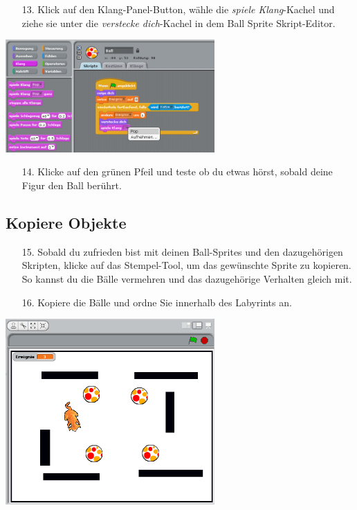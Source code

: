 \begin{itemize}
\item[13.] Klick auf den Klang-Panel-Button, wähle die \textit{spiele Klang}-Kachel und ziehe sie unter die \textit{verstecke dich}-Kachel in dem Ball Sprite Skript-Editor.
\end{itemize}
\includegraphics[width=0.6\textwidth]{images/aufgabe3_ball3.png}
\begin{itemize}
\item[14.] Klicke auf den grünen Pfeil und teste ob du etwas hörst, sobald deine Figur den Ball berührt.
\end{itemize}


\subsection{Kopiere Objekte}
\begin{itemize}
\item[15.] Sobald du zufrieden bist mit deinen Ball-Sprites und den dazugehörigen Skripten, klicke auf das Stempel-Tool, um das gewünschte Sprite zu kopieren. So kannst du die Bälle vermehren und das dazugehörige Verhalten gleich mit.
\item[16.] Kopiere die Bälle und ordne Sie innerhalb des Labyrints an.
\end{itemize}
\includegraphics[width=0.6\textwidth]{images/aufgabe3_vier_baelle.png}

